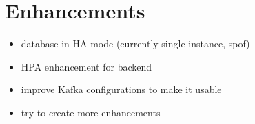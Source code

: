 \section{Enhancements}

\begin{itemize}
	\item database in HA mode (currently single instance, spof)
	\item HPA enhancement for backend
	\item improve Kafka configurations to make it usable
	\item try to create more enhancements
\end{itemize}